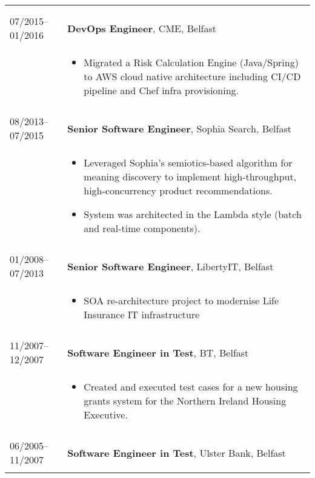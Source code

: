 \documentclass[2pt,a4paper]{article}
\newlength{\datecolumn}
\newlength{\textcolumn}
\begin{document}
\begin{longtable}{p{\datecolumn} p{\textcolumn}}
\begin{itemize}
                   \end{itemize} \\ \\
07/2015--01/2016 & \textbf{DevOps Engineer}, CME, Belfast \\
                 & \begin{itemize}
                    \item Migrated a Risk Calculation Engine (Java/Spring) to AWS cloud native architecture including CI/CD pipeline and Chef infra provisioning.
                   \end{itemize} \\ \\
08/2013--07/2015 & \textbf{Senior Software Engineer}, Sophia Search, Belfast \\
                 & \begin{itemize}
                    \item Leveraged Sophia’s semiotics-based algorithm for meaning discovery to implement high-throughput, high-concurrency product recommendations.
                    \item System was architected in the Lambda style (batch and real-time components).
                   \end{itemize} \\ \\
01/2008--07/2013 & \textbf{Senior Software Engineer}, LibertyIT, Belfast \\
                 & \begin{itemize}
                    \item SOA re-architecture project to modernise Life Insurance IT infrastructure
                   \end{itemize} \\ \\
11/2007--12/2007 & \textbf{Software Engineer in Test}, BT, Belfast \\
                 & \begin{itemize}
                    \item Created and executed test cases for a new housing grants system for the Northern Ireland Housing Executive.
                   \end{itemize} \\ \\
06/2005--11/2007 & \textbf{Software Engineer in Test}, Ulster Bank, Belfast \\
                 & \begin{itemize}

\end{itemize}
\end{longtable}
\end{document}
